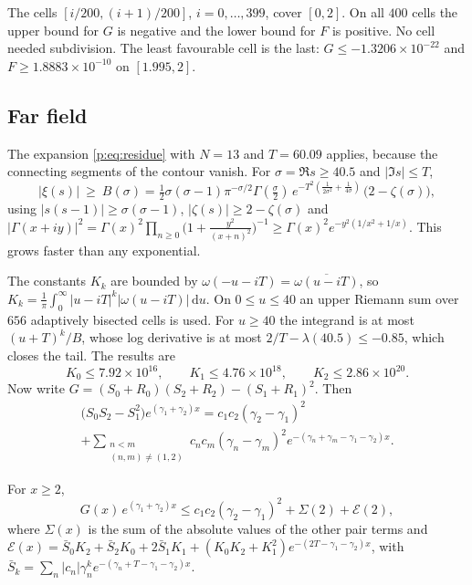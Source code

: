 The cells $[i/200,(i+1)/200]$, $i=0,\dots,399$, cover $[0,2]$. On all $400$ cells the upper bound for $G$ is negative and the lower bound for $F$ is positive. No cell needed subdivision. The least favourable cell is the last: $G\le-1.3206\times10^{-22}$ and $F\ge1.8883\times10^{-10}$ on $[1.995,2]$.

\subsection{Far field}

The expansion \eqref{p:eq:residue} with $N=13$ and $T=60.09$ applies, because the connecting segments of the contour vanish. For $\sigma=\Re s\ge40.5$ and $|\Im s|\le T$,
\[
|\xi(s)|\ \ge\ B(\sigma)=\tfrac12\sigma(\sigma-1)\pi^{-\sigma/2}\Gamma(\tfrac\sigma2)\,e^{-T^2(\frac1{2\sigma^2}+\frac1{4\sigma})}\,\big(2-\zeta(\sigma)\big),
\]
using $|s(s-1)|\ge\sigma(\sigma-1)$, $|\zeta(s)|\ge2-\zeta(\sigma)$ and $|\Gamma(x+iy)|^2=\Gamma(x)^2\prod_{n\ge0}\big(1+\frac{y^2}{(x+n)^2}\big)^{-1}\ge\Gamma(x)^2e^{-y^2(1/x^2+1/x)}$. This grows faster than any exponential.

The constants $K_k$ are bounded by $\omega(-u-iT)=\overline{\omega(u-iT)}$, so $K_k=\frac1\pi\int_0^\infty|u-iT|^k|\omega(u-iT)|\,\mathrm du$. On $0\le u\le40$ an upper Riemann sum over $656$ adaptively bisected cells is used. For $u\ge40$ the integrand is at most $(u+T)^k/B$, whose log derivative is at most $2/T-\lambda(40.5)\le-0.85$, which closes the tail. The results are
\[
K_0\le7.92\times10^{16},\qquad K_1\le4.76\times10^{18},\qquad K_2\le2.86\times10^{20}.
\]
Now write $G=(S_0+R_0)(S_2+R_2)-(S_1+R_1)^2$. Then
\begin{multline*}
\big(S_0S_2-S_1^2\big)e^{(\gamma_1+\gamma_2)x}=c_1c_2(\gamma_2-\gamma_1)^2\\+\sum_{\substack{n<m\\(n,m)\neq(1,2)}}c_nc_m(\gamma_n-\gamma_m)^2e^{-(\gamma_n+\gamma_m-\gamma_1-\gamma_2)x}.
\end{multline*}

\begin{lemma}\label{p:lem:far}
For $x\ge2$,
\[
G(x)\,e^{(\gamma_1+\gamma_2)x}\le c_1c_2(\gamma_2-\gamma_1)^2+\Sigma(2)+\mathcal E(2),
\]
where $\Sigma(x)$ is the sum of the absolute values of the other pair terms and $\mathcal E(x)=\bar S_0K_2+\bar S_2K_0+2\bar S_1K_1+(K_0K_2+K_1^2)e^{-(2T-\gamma_1-\gamma_2)x}$, with $\bar S_k=\sum_n|c_n|\gamma_n^ke^{-(\gamma_n+T-\gamma_1-\gamma_2)x}$.
\end{lemma}

